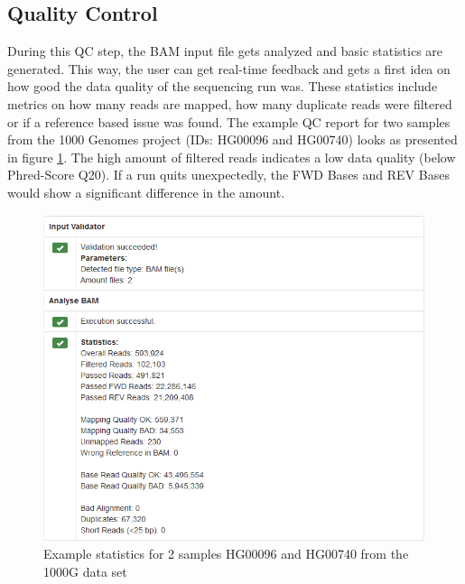\subsection{Quality Control}
During this QC step, the BAM input file gets analyzed and basic statistics are generated. This way, the user can get real-time feedback and gets a first idea on how good the data quality of the sequencing run was. These statistics include metrics on how many reads are mapped, how many duplicate reads were filtered or if a reference based issue was found. The example QC report for two samples from the 1000 Genomes project (IDs: HG00096 and HG00740) looks as presented in figure \ref{fig:mtdna-server-qc}. The high amount of filtered reads indicates a low data quality (below Phred-Score Q20). If a run quits unexpectedly, the FWD Bases and REV Bases would show a significant difference in the amount.  
\begin{figure}[!ht]
    \centering
    \includegraphics[width=1\textwidth]{images/mtdna-server-qc.png}
    \caption[Example statistics for 2 samples from 1000G]{Example statistics for 2 samples HG00096 and HG00740 from the 1000G data set}
    \label{fig:mtdna-server-qc}
\end{figure}
